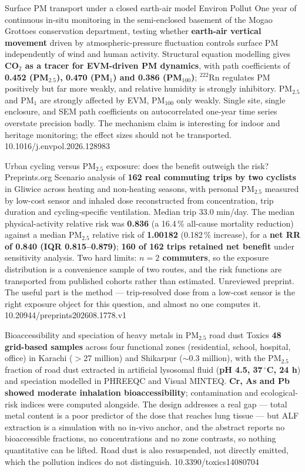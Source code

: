 \documentclass[10pt]{article}
\begin{document}
{Surface PM transport under a closed earth-air model}
{Environ Pollut}
{One year of continuous in-situ monitoring in the semi-enclosed basement of the Mogao
Grottoes conservation department, testing whether \textbf{earth-air vertical movement}
driven by atmospheric-pressure fluctuation controls surface PM independently of wind and
human activity. Structural equation modelling gives \textbf{CO$_2$ as a tracer for
EVM-driven PM dynamics}, with path coefficients of \textbf{0.452 (PM$_{2.5}$), 0.470
(PM$_1$) and 0.386 (PM$_{100}$)}; $^{222}$Rn regulates PM positively but far more weakly,
and relative humidity is strongly inhibitory. PM$_{2.5}$ and PM$_1$ are strongly affected
by EVM, PM$_{100}$ only weakly. Single site, single enclosure, and SEM path coefficients
on autocorrelated one-year time series overstate precision badly. The mechanism claim is
interesting for indoor and heritage monitoring; the effect sizes should not be
transported.}
{10.1016/j.envpol.2026.128983}

{Urban cycling versus PM$_{2.5}$ exposure: does the benefit outweigh the risk?}
{Preprints.org}
{Scenario analysis of \textbf{162 real commuting trips by two cyclists} in Gliwice across
heating and non-heating seasons, with personal PM$_{2.5}$ measured by low-cost sensor and
inhaled dose reconstructed from concentration, trip duration and cycling-specific
ventilation. Median trip 33.0 min/day. The median physical-activity relative risk was
\textbf{0.836} (a 16.4\,\% all-cause mortality reduction) against a median PM$_{2.5}$
relative risk of \textbf{1.00182} (0.182\,\% increase), for a \textbf{net RR of 0.840
(IQR 0.815--0.879)}; \textbf{160 of 162 trips retained net benefit} under sensitivity
analysis. Two hard limits: \textbf{$n = 2$ commuters}, so the exposure distribution is a
convenience sample of two routes, and the risk functions are transported from published
cohorts rather than estimated. Unreviewed preprint. The useful part is the
method --- trip-resolved dose from a low-cost sensor is the right exposure object for
this question, and almost no one computes it.}
{10.20944/preprints202608.1778.v1}

{Bioaccessibility and speciation of heavy metals in PM$_{2.5}$ road dust}
{Toxics}
{\textbf{48 grid-based samples} across four functional zones (residential, school,
hospital, office) in Karachi ($>$27 million) and Shikarpur ($\sim$0.3 million), with the
PM$_{2.5}$ fraction of road dust extracted in artificial lysosomal fluid
(\textbf{pH 4.5, 37\,$^\circ$C, 24 h}) and speciation modelled in PHREEQC and Visual
MINTEQ. \textbf{Cr, As and Pb showed moderate inhalation bioaccessibility}; contamination
and ecological-risk indices were computed alongside. The design addresses a real gap ---
total metal content is a poor predictor of the dose that reaches lung tissue --- but ALF
extraction is a simulation with no in-vivo anchor, and the abstract reports no
bioaccessible fractions, no concentrations and no zone contrasts, so nothing quantitative
can be lifted. Road dust is also resuspended, not directly emitted, which the pollution
indices do not distinguish.}
{10.3390/toxics14080704}
\end{document}
